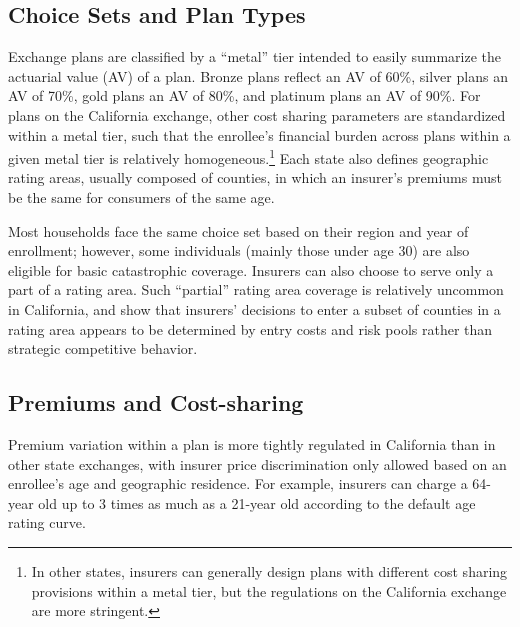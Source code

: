 \documentclass[12pt]{article}
\begin{document}
\subsection{Choice Sets and Plan Types}
Exchange plans are classified by a ``metal'' tier intended to easily summarize the actuarial value (AV) of a plan. Bronze plans reflect an AV of 60\%, silver plans an AV of 70\%, gold plans an AV of 80\%, and platinum plans an AV of 90\%. For plans on the California exchange, other cost sharing parameters are standardized within a metal tier, such that the enrollee's financial burden across plans within a given metal tier is relatively homogeneous.\footnote{In other states, insurers can generally design plans with different cost sharing provisions within a metal tier, but the regulations on the California exchange are more stringent.} Each state also defines geographic rating areas, usually composed of counties, in which an insurer's premiums must be the same for consumers of the same age.

Most households face the same choice set based on their region and year of enrollment; however, some individuals (mainly those under age 30) are also eligible for basic catastrophic coverage. Insurers can also choose to serve only a part of a rating area. Such ``partial'' rating area coverage is relatively uncommon in California, and \cite{fang2020} show that insurers' decisions to enter a subset of counties in a rating area appears to be determined by entry costs and risk pools rather than strategic competitive behavior.

\subsection{Premiums and Cost-sharing}
Premium variation within a plan is more tightly regulated in California than in other state exchanges, with insurer price discrimination only allowed based on an enrollee's age and geographic residence. For example, insurers can charge a 64-year old up to 3 times as much as a 21-year old according to the default age rating curve.
\end{document}
